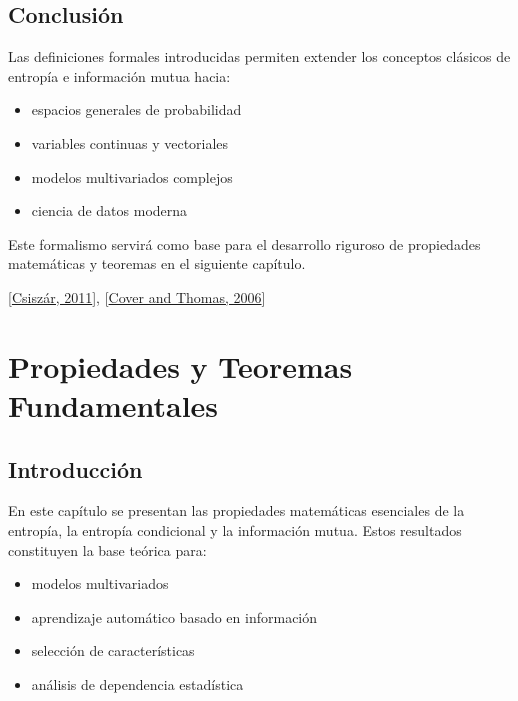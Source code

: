 \documentclass[letterpaper,10pt,english]{jupyterBook}
\begin{document}
\section{Conclusión}
\label{\detokenize{02_mathematical_foundations/formal_definitions:conclusion}}
\sphinxAtStartPar
Las definiciones formales introducidas permiten extender los conceptos
clásicos de entropía e información mutua hacia:
\begin{itemize}
\item {} 
\sphinxAtStartPar
espacios generales de probabilidad

\item {} 
\sphinxAtStartPar
variables continuas y vectoriales

\item {} 
\sphinxAtStartPar
modelos multivariados complejos

\item {} 
\sphinxAtStartPar
ciencia de datos moderna

\end{itemize}

\sphinxAtStartPar
Este formalismo servirá como base para el desarrollo riguroso de
propiedades matemáticas y teoremas en el siguiente capítulo.

\sphinxAtStartPar
{[}\hyperlink{cite.05_appendices/references:id10}{Csiszár, 2011}{]}, {[}\hyperlink{cite.05_appendices/references:id2}{Cover and Thomas, 2006}{]}

\sphinxstepscope


\chapter{Propiedades y Teoremas Fundamentales}
\label{\detokenize{02_mathematical_foundations/properties_theorems:propiedades-y-teoremas-fundamentales}}\label{\detokenize{02_mathematical_foundations/properties_theorems::doc}}

\section{Introducción}
\label{\detokenize{02_mathematical_foundations/properties_theorems:introduccion}}
\sphinxAtStartPar
En este capítulo se presentan las propiedades matemáticas esenciales
de la entropía, la entropía condicional y la información mutua.
Estos resultados constituyen la base teórica para:
\begin{itemize}
\item {} 
\sphinxAtStartPar
modelos multivariados

\item {} 
\sphinxAtStartPar
aprendizaje automático basado en información

\item {} 
\sphinxAtStartPar
selección de características

\item {} 
\sphinxAtStartPar
análisis de dependencia estadística

\end{itemize}
\end{document}
